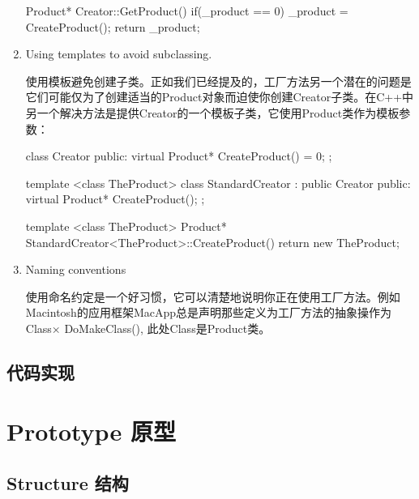 \begin{enumerate}
\begin{schemedisplay}
Product* Creator::GetProduct(){
	if(_product == 0){
		_product = CreateProduct();
	}
	return _product;
}
\end{schemedisplay}

	\item Using templates to avoid subclassing.

	使用模板避免创建子类。正如我们已经提及的，工厂方法另一个潜在的问题是它们可能仅为了创建适当的Product对象而迫使你创建Creator子类。在C++中另一个解决方法是提供Creator的一个模板子类，它使用Product类作为模板参数：

\begin{schemedisplay}
class Creator{
	public:
		virtual Product* CreateProduct() = 0;
};

template <class TheProduct> class StandardCreator : public Creator{
	public:
		virtual Product* CreateProduct();
};

template <class TheProduct>
Product* StandardCreator<TheProduct>::CreateProduct(){
	return new TheProduct;
}
\end{schemedisplay}

	\item Naming conventions

	使用命名约定是一个好习惯，它可以清楚地说明你正在使用工厂方法。例如Macintosh的应用框架MacApp总是声明那些定义为工厂方法的抽象操作为Class× DoMakeClass(), 此处Class是Product类。
	
\end{enumerate}

\subsection{代码实现}



\section{Prototype 原型}

\subsection{Structure 结构}

